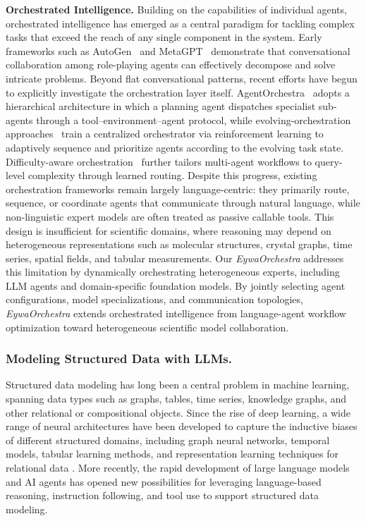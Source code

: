 \documentclass{llmxive}
\begin{document}
{\textbf{Orchestrated Intelligence.}
Building on the capabilities of individual agents, orchestrated intelligence has emerged as a central paradigm for tackling complex tasks that exceed the reach of any single component in the system. Early frameworks such as AutoGen~\cite{DBLP:journals/corr/abs-2308-08155} and MetaGPT~\cite{DBLP:conf/iclr/HongZCZCWZWYLZR24} demonstrate that conversational collaboration among role-playing agents can effectively decompose and solve intricate problems. Beyond flat conversational patterns, recent efforts have begun to explicitly investigate the orchestration layer itself. AgentOrchestra~\cite{zhang2025agentorchestra} adopts a hierarchical architecture in which a planning agent dispatches specialist sub-agents through a tool--environment--agent protocol, while evolving-orchestration approaches~\cite{DBLP:journals/corr/abs-2505-19591} train a centralized orchestrator via reinforcement learning to adaptively sequence and prioritize agents according to the evolving task state. Difficulty-aware orchestration~\cite{DBLP:journals/corr/abs-2509-11079} further tailors multi-agent workflows to query-level complexity through learned routing.
Despite this progress, existing orchestration frameworks remain largely language-centric: they primarily route, sequence, or coordinate agents that communicate through natural language, while non-linguistic expert models are often treated as passive callable tools. This design is insufficient for scientific domains, where reasoning may depend on heterogeneous representations such as molecular structures, crystal graphs, time series, spatial fields, and tabular measurements. Our \textit{EywaOrchestra} addresses this limitation by dynamically orchestrating heterogeneous experts, including LLM agents and domain-specific foundation models. By jointly selecting agent configurations, model specializations, and communication topologies, \textit{EywaOrchestra} extends orchestrated intelligence from language-agent workflow optimization toward heterogeneous scientific model collaboration.


\subsubsection{Modeling Structured Data with LLMs.}

Structured data modeling has long been a central problem in machine learning, spanning data types such as graphs, tables, time series, knowledge graphs, and other relational or compositional objects. Since the rise of deep learning, a wide range of neural architectures have been developed to capture the inductive biases of different structured domains, including graph neural networks, temporal models, tabular learning methods, and representation learning techniques for relational data \cite{wu2020comprehensive, lim2021time, borisov2022deep, antelmi2023survey, han2022data, fu2023investigating}. More recently, the rapid development of large language models and AI agents has opened new possibilities for leveraging language-based reasoning, instruction following, and tool use to support structured data modeling.

}
\end{document}

